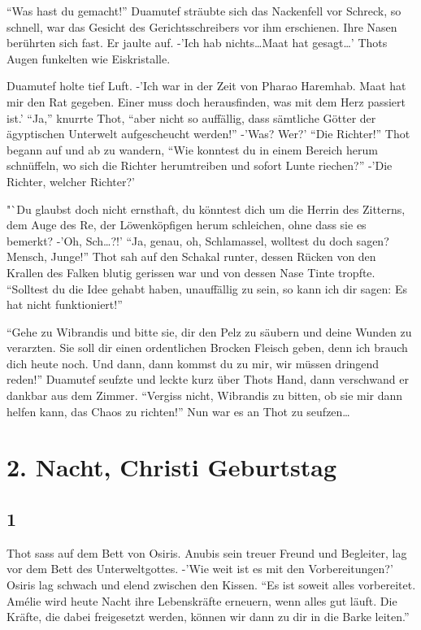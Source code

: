 \documentclass[11pt,titlepage,a5paper]{book}
\begin{document}
 "`Was hast du gemacht!"' Duamutef sträubte sich das Nackenfell vor Schreck, so schnell, war das Gesicht des Gerichtsschreibers vor ihm erschienen. Ihre Nasen berührten sich fast. Er jaulte auf. -'Ich hab nichts\dots Maat hat gesagt\dots' Thots Augen funkelten wie Eiskristalle. 

Duamutef holte tief Luft. -'Ich war in der Zeit von Pharao Haremhab. Maat hat mir den Rat gegeben. Einer muss doch herausfinden, was mit dem Herz passiert ist.' "`Ja,"' knurrte Thot, "`aber nicht so auffällig, dass sämtliche Götter der ägyptischen Unterwelt aufgescheucht werden!"' -'Was? Wer?' "`Die Richter!"' Thot begann auf und ab zu wandern, "`Wie konntest du in einem Bereich herum schnüffeln, wo sich die Richter herumtreiben und sofort Lunte riechen?"' -'Die Richter, welcher Richter?'

 "`Du glaubst doch nicht ernsthaft, du könntest dich um die Herrin des Zitterns, dem Auge des Re, der Löwenköpfigen herum schleichen, ohne dass sie es bemerkt? -'Oh, Sch\dots?!' "`Ja, genau, oh, Schlamassel, wolltest du doch sagen? Mensch, Junge!"' Thot sah auf den Schakal runter, dessen Rücken von den Krallen des Falken blutig gerissen war und von dessen Nase Tinte tropfte. "`Solltest du die Idee gehabt haben, unauffällig zu sein, so kann ich dir sagen: Es hat nicht funktioniert!"'

"`Gehe zu Wibrandis und bitte sie, dir den Pelz zu säubern und deine Wunden zu verarzten. Sie soll dir einen ordentlichen Brocken Fleisch geben, denn ich brauch dich heute noch. Und dann, dann kommst du zu mir, wir müssen dringend reden!"' Duamutef seufzte und leckte kurz über Thots Hand, dann verschwand er dankbar aus dem Zimmer. "`Vergiss nicht, Wibrandis zu bitten, ob sie mir dann helfen kann, das Chaos zu richten!"' Nun war es an Thot zu seufzen\dots

\chapter*{2. Nacht, Christi Geburtstag}

\section*{1}

Thot sass auf dem Bett von Osiris. Anubis sein treuer Freund und Begleiter, lag vor dem Bett des Unterweltgottes. -'Wie weit ist es mit den Vorbereitungen?' Osiris lag schwach und elend zwischen den Kissen. "`Es ist soweit alles vorbereitet. Amélie wird heute Nacht ihre Lebenskräfte erneuern, wenn alles gut läuft. Die Kräfte, die dabei freigesetzt werden, können wir dann zu dir in die Barke leiten."'
\end{document}
